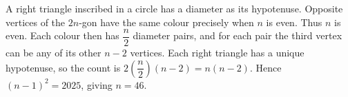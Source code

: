 A right triangle inscribed in a circle has a diameter as its hypotenuse. Opposite vertices of the $2n$-gon have the same colour precisely when $n$ is even. Thus $n$ is even. Each colour then has $\dfrac{n}{2}$ diameter pairs, and for each pair the third vertex can be any of its other $n-2$ vertices. Each right triangle has a unique hypotenuse, so the count is $2(\dfrac{n}{2})(n-2)=n(n-2)$. Hence $(n-1)^2=2025$, giving $\boxed{n=46}$.
